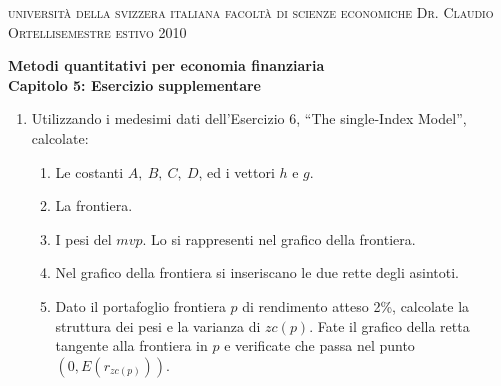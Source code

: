 \documentclass[a4paper,12pt]{article}
\begin{document}
{\small \textsc{universit\`{a} della svizzera italiana}}\hfill {\small 
\textsc{facolt\`{a} di scienze economiche}}\newline
{\small \textsc{Dr. Claudio Ortelli}}\hfill {\small \textsc{semestre estivo
2010}}

\vspace{0.2cm}

\begin{center}
\textbf{{\large Metodi quantitativi per economia finanziaria \\[0pt]
\vspace{0.5cm} Capitolo 5: Esercizio supplementare}}
\end{center}

\vspace{0.1cm}

\hrulefill

\vspace{0.3cm}


\begin{enumerate}
\item Utilizzando i medesimi dati dell'Esercizio 6, \textquotedblleft The single-Index Model\textquotedblright, calcolate:

\begin{enumerate}
\item Le costanti $A,~B,~C,~D$, ed i vettori $h$ e $g$.

\item La frontiera.

\item I pesi del $mvp$. Lo si rappresenti nel grafico della frontiera.

\item Nel grafico della frontiera si inseriscano le due rette degli asintoti.

\item Dato il portafoglio frontiera $p$ di rendimento atteso 2\%, calcolate
la struttura dei pesi e la varianza di $zc(p)$. Fate il grafico della retta
tangente alla frontiera in $p$ e verificate che passa nel punto $(0,E(r_{zc(p)}))$.
\end{enumerate}
\end{enumerate}
\end{document}
